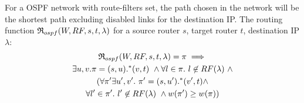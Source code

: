 \noindent 
For a OSPF network with route-filters set, the
path chosen in the network will be the shortest path
excluding disabled links for the destination IP. The routing
function $\mathfrak{R}_{ospf}(W,RF,s,t,\lambda)$ for a
source router $s$, target router $t$, destination IP 
$\lambda$: 
\begin{multline}
\mathfrak{R}_{ospf}(W,RF,s,t,\lambda) = \pi \implies 
\\ \exists u,v. \pi=(s,u).^*(v,t) ~\wedge 
\forall l \in \pi.~l \not\in RF(\lambda) ~\wedge  \\
(\forall \pi' \exists u',v'. ~\pi'=(s,u').^*(v',t) \wedge \\
\forall l' \in \pi'.~l' \not\in RF(\lambda) ~\wedge
w(\pi') \geq w(\pi))
\end{multline}


